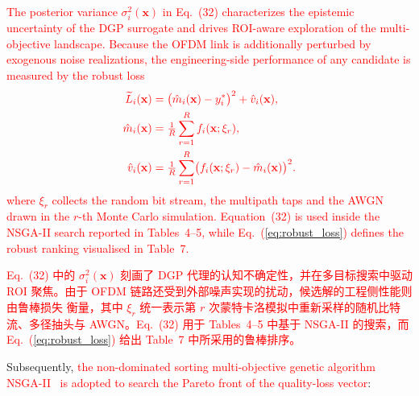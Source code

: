 \documentclass[11pt]{article}
\begin{document}
\textcolor{red}{The posterior variance $\sigma_{i}^{2}(\mathbf{x})$ in Eq.~(32) characterizes the epistemic uncertainty of the DGP surrogate and drives ROI-aware exploration of the multi-objective landscape. Because the OFDM link is additionally perturbed by exogenous noise realizations, the engineering-side performance of any candidate is measured by the robust loss}%
\begin{equation}\label{eq:robust_loss}
\textcolor{red}{\begin{aligned}
\widetilde{L}_{i}(\mathbf{x}) &= \bigl({{\hat{m}}_{i}}(\mathbf{x}) - y_{i}^{*}\bigr)^{2} + {{\hat{v}}_{i}}(\mathbf{x}),\\
{{\hat{m}}_{i}}(\mathbf{x}) &= \tfrac{1}{R}\sum_{r=1}^{R} f_{i}(\mathbf{x};\xi_{r}),\\
{{\hat{v}}_{i}}(\mathbf{x}) &= \tfrac{1}{R}\sum_{r=1}^{R}\bigl(f_{i}(\mathbf{x};\xi_{r})-{{\hat{m}}_{i}}(\mathbf{x})\bigr)^{2}.
\end{aligned}}%
\end{equation}
\textcolor{red}{where $\xi_{r}$ collects the random bit stream, the multipath taps and the AWGN drawn in the $r$-th Monte Carlo simulation. Equation~(32) is used inside the NSGA-II search reported in Tables~4--5, while Eq.~(\ref{eq:robust_loss}) defines the robust ranking visualised in Table~7.}%

\textcolor{red}{Eq.~(32) 中的 $\sigma_{i}^{2}(\mathbf{x})$ 刻画了 DGP 代理的认知不确定性，并在多目标搜索中驱动 ROI 聚焦。由于 OFDM 链路还受到外部噪声实现的扰动，候选解的工程侧性能则由鲁棒损失}%
\textcolor{red}{衡量，其中 $\xi_{r}$ 统一表示第 $r$ 次蒙特卡洛模拟中重新采样的随机比特流、多径抽头与 AWGN。Eq.~(32) 用于 Tables~4--5 中基于 NSGA-II 的搜索，而 Eq.~(\ref{eq:robust_loss}) 给出 Table~7 中所采用的鲁棒排序。}%

Subsequently, \textcolor{red}{the non-dominated sorting multi-objective genetic algorithm NSGA-II~\citep{Deb2002} is adopted to search the Pareto front of the quality-loss vector}:%
\end{document}
